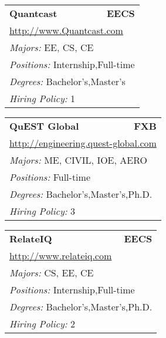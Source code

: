 \documentclass[twoside]{article}
\begin{document}
\begin{center}
\begin{multicols}{3}
\begin{FlushLeft}
\begin{minipage}{.9\columnwidth}
\end{minipage}
 
\begin{minipage}{.9\columnwidth}\begin{tabularx}{.95\columnwidth}{Xr}
                 {\Large\bf Quantcast} & {\Large\bf EECS}\\
    \multicolumn{2}{p{.95\columnwidth}}{\url{http://www.Quantcast.com}}\\
    \multicolumn{2}{p{.95\columnwidth}}{\emph{Majors:} EE, CS, CE}\\
    \multicolumn{2}{p{.95\columnwidth}}{\emph{Positions:} Internship,Full-time}\\
    \multicolumn{2}{p{.95\columnwidth}}{\emph{Degrees:} Bachelor's,Master's}\\
    \multicolumn{2}{p{.95\columnwidth}}{\emph{Hiring Policy:} 1}\\
    \end{tabularx}
    
\end{minipage}
 
\begin{minipage}{.9\columnwidth}\begin{tabularx}{.95\columnwidth}{Xr}
                 {\Large\bf QuEST Global} & {\Large\bf FXB}\\
    \multicolumn{2}{p{.95\columnwidth}}{\url{http://engineering.quest-global.com}}\\
    \multicolumn{2}{p{.95\columnwidth}}{\emph{Majors:} ME, CIVIL, IOE, AERO}\\
    \multicolumn{2}{p{.95\columnwidth}}{\emph{Positions:} Full-time}\\
    \multicolumn{2}{p{.95\columnwidth}}{\emph{Degrees:} Bachelor's,Master's,Ph.D.}\\
    \multicolumn{2}{p{.95\columnwidth}}{\emph{Hiring Policy:} 3}\\
    \end{tabularx}
    
\end{minipage}
 
\begin{minipage}{.9\columnwidth}\begin{tabularx}{.95\columnwidth}{Xr}
                 {\Large\bf RelateIQ} & {\Large\bf EECS}\\
    \multicolumn{2}{p{.95\columnwidth}}{\url{http://www.relateiq.com}}\\
    \multicolumn{2}{p{.95\columnwidth}}{\emph{Majors:} CS, EE, CE}\\
    \multicolumn{2}{p{.95\columnwidth}}{\emph{Positions:} Internship,Full-time}\\
    \multicolumn{2}{p{.95\columnwidth}}{\emph{Degrees:} Bachelor's,Master's,Ph.D.}\\
    \multicolumn{2}{p{.95\columnwidth}}{\emph{Hiring Policy:} 2}\\
    \end{tabularx}
    

\end{minipage}
\end{FlushLeft}
\end{multicols}
\end{center}
\end{document}
